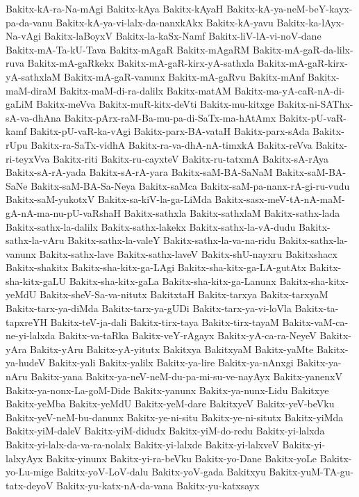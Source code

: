 {Bakitx-kA-ra-Na-mAgi
Bakitx-kAya
Bakitx-kAyaH
Bakitx-kA-ya-neM-beY-kayx-pa-da-vanu
Bakitx-kA-ya-vi-lalx-da-nanxkAkx
Bakitx-kA-yavu
Bakitx-ka-lAyx-Na-vAgi
Bakitx-laBoyxV
Bakitx-la-kaSx-Namf
Bakitx-liV-lA-vi-noV-dane
Bakitx-mA-Ta-kU-Tava
Bakitx-mAgaR
Bakitx-mAgaRM
Bakitx-mA-gaR-da-lilx-ruva
Bakitx-mA-gaRkekx
Bakitx-mA-gaR-kirx-yA-sathxla
Bakitx-mA-gaR-kirx-yA-sathxlaM
Bakitx-mA-gaR-vanunx
Bakitx-mA-gaRvu
Bakitx-mAnf
Bakitx-maM-diraM
Bakitx-maM-di-ra-dalilx
Bakitx-matAM
Bakitx-ma-yA-caR-nA-di-gaLiM
Bakitx-meVva
Bakitx-muR-kitx-deVti
Bakitx-mu-kitxge
Bakitx-ni-SAThx-sA-va-dhAna
Bakitx-pArx-raM-Ba-mu-pa-di-SaTx-ma-hAtAmx
Bakitx-pU-vaR-kamf
Bakitx-pU-vaR-ka-vAgi
Bakitx-parx-BA-vataH
Bakitx-parx-sAda
Bakitx-rUpu
Bakitx-ra-SaTx-vidhA
Bakitx-ra-va-dhA-nA-timxkA
Bakitx-reVva
Bakitx-ri-teyxVva
Bakitx-riti
Bakitx-ru-cayxteV
Bakitx-ru-tatxmA
Bakitx-sA-rAya
Bakitx-sA-rA-yada
Bakitx-sA-rA-yara
Bakitx-saM-BA-SaNaM
Bakitx-saM-BA-SaNe
Bakitx-saM-BA-Sa-Neya
Bakitx-saMca
Bakitx-saM-pa-nanx-rA-gi-ru-vudu
Bakitx-saM-yukotxV
Bakitx-sa-kiV-la-ga-LiMda
Bakitx-sasx-meV-tA-nA-maM-gA-nA-ma-nu-pU-vaRshaH
Bakitx-sathxla
Bakitx-sathxlaM
Bakitx-sathx-lada
Bakitx-sathx-la-dalilx
Bakitx-sathx-lakekx
Bakitx-sathx-la-vA-dudu
Bakitx-sathx-la-vAru
Bakitx-sathx-la-valeY
Bakitx-sathx-la-va-na-ridu
Bakitx-sathx-la-vanunx
Bakitx-sathx-lave
Bakitx-sathx-laveV
Bakitx-shU-nayxru
Bakitxshacx
Bakitx-shakitx
Bakitx-sha-kitx-ga-LAgi
Bakitx-sha-kitx-ga-LA-gutAtx
Bakitx-sha-kitx-gaLU
Bakitx-sha-kitx-gaLa
Bakitx-sha-kitx-ga-Lanunx
Bakitx-sha-kitx-yeMdU
Bakitx-sheV-Sa-va-nitutx
BakitxtaH
Bakitx-tarxya
Bakitx-tarxyaM
Bakitx-tarx-ya-diMda
Bakitx-tarx-ya-gUDi
Bakitx-tarx-ya-vi-loVla
Bakitx-ta-tapxreYH
Bakitx-teV-ja-dali
Bakitx-tirx-taya
Bakitx-tirx-tayaM
Bakitx-vaM-ca-ne-yi-lalxda
Bakitx-va-taRka
Bakitx-veY-rAgayx
Bakitx-yA-ca-ra-NeyeV
Bakitx-yAra
Bakitx-yAru
Bakitx-yA-yitutx
Bakitxya
BakitxyaM
Bakitx-yaMte
Bakitx-ya-hudeV
Bakitx-yali
Bakitx-yalilx
Bakitx-ya-lire
Bakitx-ya-nAnxgi
Bakitx-ya-nAru
Bakitx-yana
Bakitx-ya-neV-neM-du-pa-mi-su-ve-nayAyx
Bakitx-yanenxV
Bakitx-ya-nonx-La-goM-Dide
Bakitx-yanunx
Bakitx-ya-nunx-Lidu
Bakitxye
Bakitx-yeMba
Bakitx-yeMdU
Bakitx-yeM-dare
BakitxyeV
Bakitx-yeV-beVku
Bakitx-yeV-neM-bu-danunx
Bakitx-ye-ni-situ
Bakitx-ye-ni-situtx
Bakitx-yiMda
Bakitx-yiM-daleV
Bakitx-yiM-didudx
Bakitx-yiM-do-redu
Bakitx-yi-lalxda
Bakitx-yi-lalx-da-va-ra-nolalx
Bakitx-yi-lalxde
Bakitx-yi-lalxveV
Bakitx-yi-lalxyAyx
Bakitx-yinunx
Bakitx-yi-ra-beVku
Bakitx-yo-Dane
Bakitx-yoLe
Bakitx-yo-Lu-mige
Bakitx-yoV-LoV-dalu
Bakitx-yoV-gada
Bakitxyu
Bakitx-yuM-TA-gu-tatx-deyoV
Bakitx-yu-katx-nA-da-vana
Bakitx-yu-katxsayx
}
